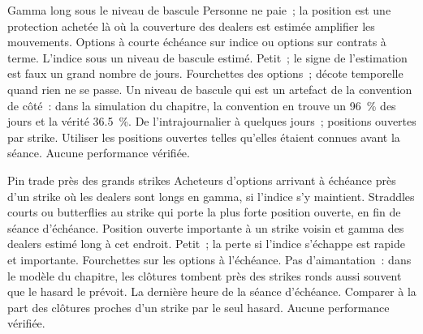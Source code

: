 \begin{strategyfile}{Gamma long sous le niveau de bascule}\label{strat:s2:zero-day-options-and-dealer-gamma-flows:flip}
 Personne ne paie~; la position est une protection achetée là où la couverture des dealers est estimée amplifier les mouvements.
 Options à courte échéance sur indice ou options sur contrats à terme.
 L'indice sous un niveau de bascule estimé.
 Petit~; le signe de l'estimation est faux un grand nombre de jours.
 Fourchettes des options~; décote temporelle quand rien ne se passe.
 Un niveau de bascule qui est un artefact de la convention de côté~: dans la simulation du chapitre, la convention en trouve un 96~\% des jours et
la vérité 36.5~\%.
 De l'intrajournalier à quelques jours~; positions ouvertes par strike.
 Utiliser les positions ouvertes telles qu'elles étaient connues avant la séance.
 Aucune performance vérifiée.
\end{strategyfile}

\begin{strategyfile}{Pin trade près des grands strikes}\label{strat:s2:zero-day-options-and-dealer-gamma-flows:pin}
 Acheteurs d'options arrivant à échéance près d'un strike où les dealers sont longs en gamma, si l'indice s'y maintient.
 Straddles courts ou butterflies au strike qui porte la plus forte position ouverte, en fin de séance d'échéance.
 Position ouverte importante à un strike voisin et gamma des dealers estimé long à cet endroit.
 Petit~; la perte si l'indice s'échappe est rapide et importante.
 Fourchettes sur les options à l'échéance.
 Pas d'aimantation~: dans le modèle du chapitre, les clôtures tombent près des strikes ronds aussi souvent que le hasard le prévoit.
 La dernière heure de la séance d'échéance.
 Comparer à la part des clôtures proches d'un strike par le seul hasard.
 Aucune performance vérifiée.
\end{strategyfile}

